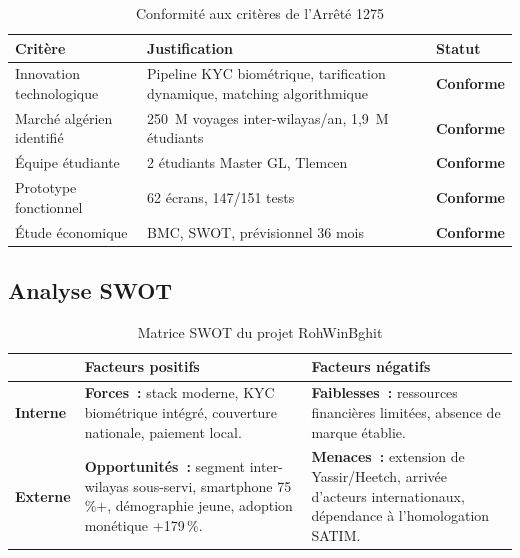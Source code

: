 \begin{table}[H]
\centering
\footnotesize
\renewcommand{\arraystretch}{1.3}
\begin{tabularx}{\textwidth}{|p{4cm}|X|p{2.5cm}|}
\hline
\rowcolor{rohlight}
\textbf{Critère} & \textbf{Justification} & \textbf{Statut} \\
\hline
Innovation technologique & Pipeline KYC biométrique, tarification dynamique, matching algorithmique & \textcolor{green!60!black}{\textbf{Conforme}} \\
\hline
Marché algérien identifié & 250~M voyages inter-wilayas/an, 1,9~M étudiants & \textcolor{green!60!black}{\textbf{Conforme}} \\
\hline
Équipe étudiante & 2 étudiants Master GL, Tlemcen & \textcolor{green!60!black}{\textbf{Conforme}} \\
\hline
Prototype fonctionnel & 62 écrans, 147/151 tests & \textcolor{green!60!black}{\textbf{Conforme}} \\
\hline
Étude économique & BMC, SWOT, prévisionnel 36 mois & \textcolor{green!60!black}{\textbf{Conforme}} \\
\hline
\end{tabularx}
  \caption{Conformité aux critères de l'Arrêté 1275}
  \label{tab:arrete1275}
\end{table}

\subsection{Analyse SWOT}

\begin{table}[H]
\centering
\begin{tabularx}{\textwidth}{|>{\columncolor{rohlight}}l|X|X|}
\hline
 & \textbf{Facteurs positifs} & \textbf{Facteurs négatifs} \\
\hline
\textbf{Interne} & \textbf{Forces~:} stack moderne, KYC biométrique intégré, couverture nationale, paiement local. & \textbf{Faiblesses~:} ressources financières limitées, absence de marque établie. \\
\hline
\textbf{Externe} & \textbf{Opportunités~:} segment inter-wilayas sous-servi, smartphone 75\,\%+, démographie jeune, adoption monétique +179\,\%. & \textbf{Menaces~:} extension de Yassir/Heetch, arrivée d'acteurs internationaux, dépendance à l'homologation SATIM. \\
\hline
\end{tabularx}
  \caption{Matrice SWOT du projet RohWinBghit}
\end{table}

